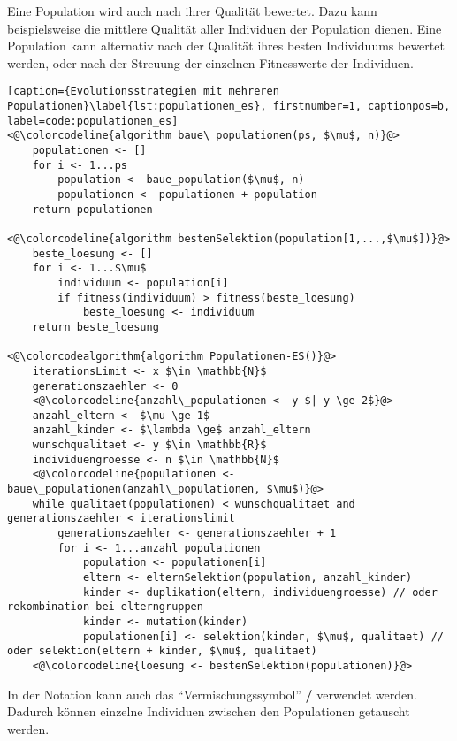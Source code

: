 Eine Population wird auch nach ihrer Qualität bewertet.
Dazu kann beispielsweise die mittlere Qualität aller Individuen der Population dienen.
Eine Population kann alternativ nach der Qualität ihres besten Individuums bewertet werden, oder nach der Streuung der einzelnen Fitnesswerte der Individuen.

\begin{lstlisting}[caption={Evolutionsstrategien mit mehreren Populationen}\label{lst:populationen_es}, firstnumber=1, captionpos=b, label=code:populationen_es]
<@\colorcodeline{algorithm baue\_populationen(ps, $\mu$, n)}@>
	populationen <- []
	for i <- 1...ps
		population <- baue_population($\mu$, n)	
		populationen <- populationen + population
	return populationen
	
<@\colorcodeline{algorithm bestenSelektion(population[1,...,$\mu$])}@>
	beste_loesung <- []
	for i <- 1...$\mu$
		individuum <- population[i]
		if fitness(individuum) > fitness(beste_loesung)
			beste_loesung <- individuum
	return beste_loesung

<@\colorcodealgorithm{algorithm Populationen-ES()}@>
	iterationsLimit <- x $\in \mathbb{N}$
	generationszaehler <- 0
	<@\colorcodeline{anzahl\_populationen <- y $| y \ge 2$}@>
	anzahl_eltern <- $\mu \ge 1$
	anzahl_kinder <- $\lambda \ge$ anzahl_eltern
	wunschqualitaet <- y $\in \mathbb{R}$
	individuengroesse <- n $\in \mathbb{N}$
	<@\colorcodeline{populationen <- baue\_populationen(anzahl\_populationen, $\mu$)}@>
	while qualitaet(populationen) < wunschqualitaet and generationszaehler < iterationslimit
		generationszaehler <- generationszaehler + 1
		for i <- 1...anzahl_populationen
			population <- populationen[i]
			eltern <- elternSelektion(population, anzahl_kinder)
			kinder <- duplikation(eltern, individuengroesse) // oder rekombination bei elterngruppen
			kinder <- mutation(kinder)
			populationen[i] <- selektion(kinder, $\mu$, qualitaet) // oder selektion(eltern + kinder, $\mu$, qualitaet)
	<@\colorcodeline{loesung <- bestenSelektion(populationen)}@>
\end{lstlisting}

In der Notation kann auch das \enquote{Vermischungssymbol} \textbf{/} verwendet werden. Dadurch können einzelne Individuen zwischen den Populationen getauscht werden.

